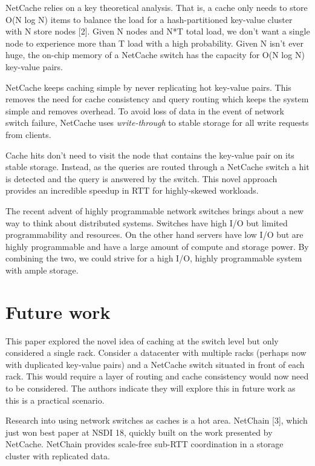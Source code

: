 \documentclass[11pt,twoside,twocolumn]{article}
\begin{document}
NetCache relies on a key theoretical analysis. That is, a cache only needs to store O(N log N) items to balance the load for a hash-partitioned key-value cluster with N store nodes [2]. Given N nodes and N*T total load, we don't want a single node to experience more than T load with a high probability. Given N isn't ever huge, the on-chip memory of a NetCache switch has the capacity for O(N log N) key-value pairs.

NetCache keeps caching simple by never replicating hot key-value pairs. This removes the need for cache consistency and query routing which keeps the system simple and removes overhead. To avoid loss of data in the event of network switch failure, NetCache uses \textit{write-through} to stable storage for all write requests from clients.

Cache hits don't need to visit the node that contains the key-value pair on its stable storage. Instead, as the queries are routed through a NetCache switch a hit is detected and the query is answered by the switch. This novel approach provides an incredible speedup in RTT for highly-skewed workloads.

The recent advent of highly programmable network switches brings about a new way to think about distributed systems. Switches have high I/O but limited programmability and resources. On the other hand servers have low I/O but are highly programmable and have a large amount of compute and storage power. By combining the two, we could strive for a high I/O, highly programmable system with ample storage.


\section*{Future work}

This paper explored the novel idea of caching at the switch level but only considered a single rack. Consider a datacenter with multiple racks (perhaps now with duplicated key-value pairs) and a NetCache switch situated in front of each rack. This would require a layer of routing and cache consistency would now need to be considered. The authors indicate they will explore this in future work as this is a practical scenario.

Research into using network switches as caches is a hot area. NetChain [3], which just won best paper at NSDI 18, quickly built on the work presented by NetCache. NetChain provides scale-free sub-RTT coordination in a storage cluster with replicated data.
\end{document}
